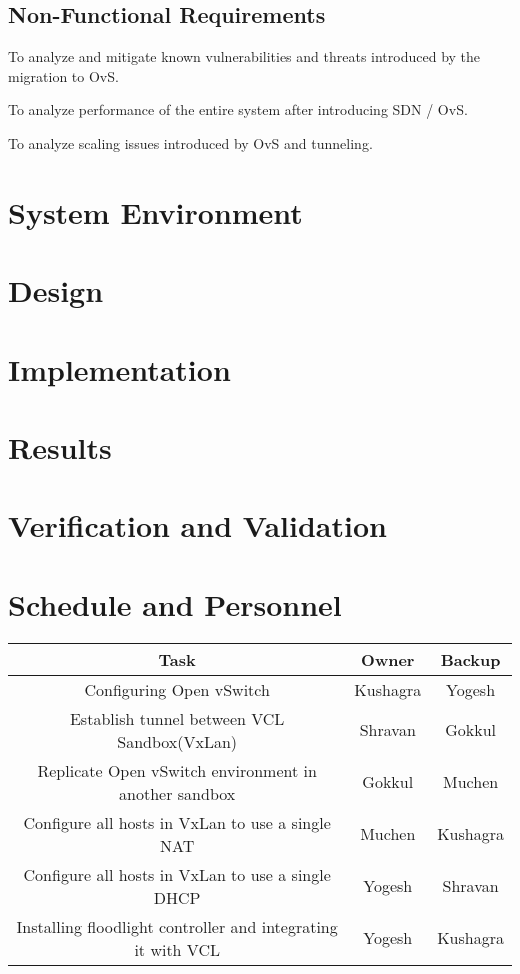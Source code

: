 \documentclass{article}
\begin{document}
\subsection{Non-Functional Requirements}
    \item To analyze and mitigate known vulnerabilities and threats introduced by the migration to OvS.
    \item To analyze performance of the entire system after introducing SDN / OvS.
    \item To analyze scaling issues introduced by OvS and tunneling. 
    
\section{System Environment}
\section{Design}
\section{Implementation}
\section{Results}
\section{Verification and Validation}
\section{Schedule and Personnel}

\begin{center}
 \begin{tabular}{||c | c | c ||} 
 \hline
 Task & Owner & Backup \\ [2ex] 
 \hline\hline
  Configuring Open vSwitch & Kushagra & Yogesh  \\
  \hline
  Establish tunnel between VCL Sandbox(VxLan) & Shravan & Gokkul  \\ 
  \hline
  Replicate Open vSwitch environment in another sandbox & Gokkul & Muchen  \\ 
  \hline
  Configure all hosts in VxLan to use a single NAT & Muchen & Kushagra  \\ 
  \hline
  Configure all hosts in VxLan to use a single DHCP & Yogesh & Shravan  \\ 
  \hline
    Installing floodlight controller and integrating it with VCL & Yogesh & Kushagra  \\ 
 \hline
\end{tabular}
\end{center}
\end{document}
